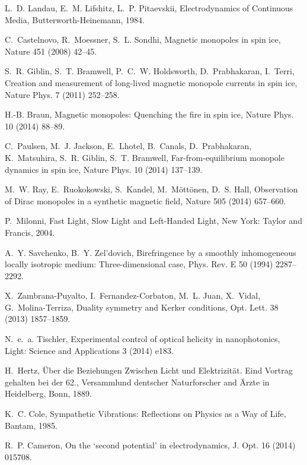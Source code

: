 \documentclass[1p,sort&compress]{elsarticle}
\numberwithin{equation}{section}
\begin{document}
\begin{thebibliography}{999}
L.~D. Landau, E.~M. Lifshitz, L.~P. Pitaevskii, {Electrodynamics of Continuous
  Media}, Butterworth-Heinemann, 1984.

C.~Castelnovo, R.~Moessner, S.~L. Sondhi, {Magnetic monopoles in spin ice},
  Nature 451 (2008) 42--45.

S.~R. Giblin, S.~T. Bramwell, P.~C.~W. Holdsworth, D.~Prabhakaran, I.~Terri,
  {Creation and measurement of long-lived magnetic monopole currents in spin
  ice}, Nature Phys. 7 (2011) 252--258.

H.-B. Braun, {Magnetic monopoles: Quenching the fire in spin ice}, Nature Phys.
  10 (2014) 88--89.

C.~Paulsen, M.~J. Jackson, E.~Lhotel, B.~Canals, D.~Prabhakaran, K.~Matsuhira,
  S.~R. Giblin, S.~T. Bramwell, {Far-from-equilibrium monopole dynamics in spin
  ice}, Nature Phys. 10 (2014) 137--139.

M.~W. Ray, E.~Ruokokowski, S.~Kandel, M.~M\"ott\"onen, D.~S. Hall, {Observation
  of Dirac monopoles in a synthetic magnetic field}, Nature 505 (2014)
  657--660.

P.~Milonni, {Fast Light, Slow Light and Left-Handed Light}, New York: Taylor
  and Francis, 2004.

A.~Y. Savchenko, B.~Y. Zel'dovich, {Birefringence by a smoothly inhomogeneous
  locally isotropic medium: Three-dimensional case}, Phys. Rev. E 50 (1994)
  2287--2292.

X.~Zambrana-Puyalto, I.~Fernandez-Corbaton, M.~L. Juan, X.~Vidal,
  G.~Molina-Terriza, {Duality symmetry and Kerker conditions}, Opt. Lett. 38
  (2013) 1857--1859.

N.~e.~a. Tischler, {Experimental control of optical helicity in nanophotonics},
  Light: Science and Applications 3 (2014) e183.

H.~Hertz, {\"{U}ber die Beziehungen Zwischen Licht und Elektrizit\"{a}t. Eind
  Vortrag gehalten bei der 62.}, Versammlund dentscher Naturforscher and
  \"{A}rzte in Heidelberg, Bonn, 1889.

K.~C. Cole, {Sympathetic Vibrations: Reflections on Physics as a Way of Life},
  Bantam, 1985.

R.~P. Cameron, {On the `second potential' in electrodynamics}, J. Opt. 16
  (2014) 015708.


\end{thebibliography}
\end{document}
